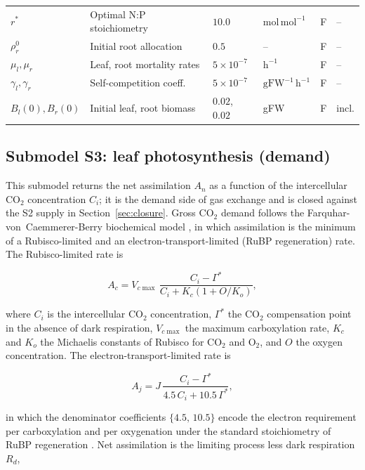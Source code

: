 \documentclass[a4paper,fleqn]{cas-sc}
\begin{document}
\begin{table}[!htbp]
\begin{tabular}{@{}llllll@{}}
$r^{*}$         & Optimal N:P stoichiometry     & $10.0$  & $\mathrm{mol\,mol^{-1}}$ & F & -- \\
$\rho_r^{0}$    & Initial root allocation       & $0.5$   & --   & F & -- \\
$\mu_l,\mu_r$   & Leaf, root mortality rates    & $5\times10^{-7}$ & $\mathrm{h^{-1}}$ & F & -- \\
$\gamma_l,\gamma_r$ & Self-competition coeff.   & $5\times10^{-7}$ & $\mathrm{gFW^{-1}\,h^{-1}}$ & F & -- \\
$B_l(0),B_r(0)$ & Initial leaf, root biomass    & $0.02$, $0.02$ & gFW & F & incl. \\
\bottomrule
\end{tabular}
\end{table}

\subsection{Submodel S3: leaf photosynthesis (demand)}
\label{sec:farquhar}

This submodel returns the net assimilation $A_n$ as a function of the
intercellular CO$_2$ concentration $C_i$; it is the demand side of gas
exchange and is closed against the S2 supply in Section~\ref{sec:closure}.
Gross CO$_2$ demand follows the Farquhar-von~Caemmerer-Berry biochemical
model \citep{Farquhar1980,vonCaemmerer2000}, in which assimilation is the
minimum of a Rubisco-limited and an electron-transport-limited (RuBP
regeneration) rate. The Rubisco-limited rate is

\begin{equation}
A_c =
V_{c\max}\,
\frac{C_i - \Gamma^{*}}
{C_i + K_c\!\left(1 + O/K_o\right)},
\label{eq:Ac}
\end{equation}

where $C_i$ is the intercellular CO$_2$ concentration, $\Gamma^{*}$ the
CO$_2$ compensation point in the absence of dark respiration, $V_{c\max}$
the maximum carboxylation rate, $K_c$ and $K_o$ the Michaelis constants of
Rubisco for CO$_2$ and O$_2$, and $O$ the oxygen concentration. The
electron-transport-limited rate is

\begin{equation}
A_j =
J\,
\frac{C_i - \Gamma^{*}}
{4.5\,C_i + 10.5\,\Gamma^{*}},
\label{eq:Aj}
\end{equation}

in which the denominator coefficients $\{4.5,\,10.5\}$ encode the electron
requirement per carboxylation and per oxygenation under the standard
stoichiometry of RuBP regeneration \citep{vonCaemmerer1981,vonCaemmerer2000}.
Net assimilation is the limiting process less dark respiration $R_d$,
\end{document}
